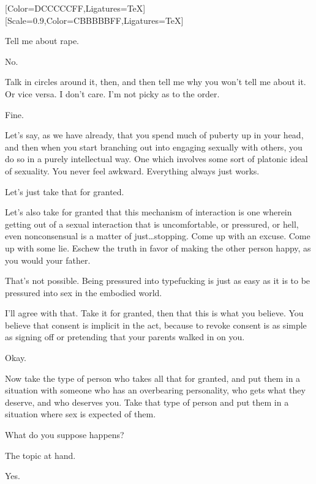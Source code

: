 \label{sex:rape}
[Color=DCCCCCFF,Ligatures=TeX]
\renewfontfamily{}[Scale=0.9,Color=CBBBBBFF,Ligatures=TeX]

\begin{ally}
Tell me about rape.
\end{ally}
No.

\begin{ally}
Talk in circles around it, then, and then tell me why you won't tell me about it. Or vice versa. I don't care. I'm not picky as to the order.
\end{ally}
Fine.
\newpage

\noindent Let's say, as we have already, that you spend much of puberty up in your head, and then when you start branching out into engaging sexually with others, you do so in a purely intellectual way. One which involves some sort of platonic ideal of sexuality. You never feel awkward. Everything always just works.

Let's just take that for granted.

Let's also take for granted that this mechanism of interaction is one wherein getting out of a sexual interaction that is uncomfortable, or pressured, or hell, even nonconsensual is a matter of just\ldots{}stopping. Come up with an excuse. Come up with some lie. Eschew the truth in favor of making the other person happy, as you would your father.

\begin{ally}
That's not possible. Being pressured into typefucking is just as easy as it is to be pressured into sex in the embodied world.
\end{ally}
I'll agree with that. Take it for granted, then that this is what you believe. You believe that consent is implicit in the act, because to revoke consent is as simple as signing off or pretending that your parents walked in on you.

\begin{ally}
Okay.
\end{ally}
Now take the type of person who takes all that for granted, and put them in a situation with someone who has an overbearing personality, who gets what they deserve, and who deserves you. Take that type of person and put them in a situation where sex is expected of them.

What do you suppose happens?

\begin{ally}
The topic at hand.
\end{ally}
Yes.

